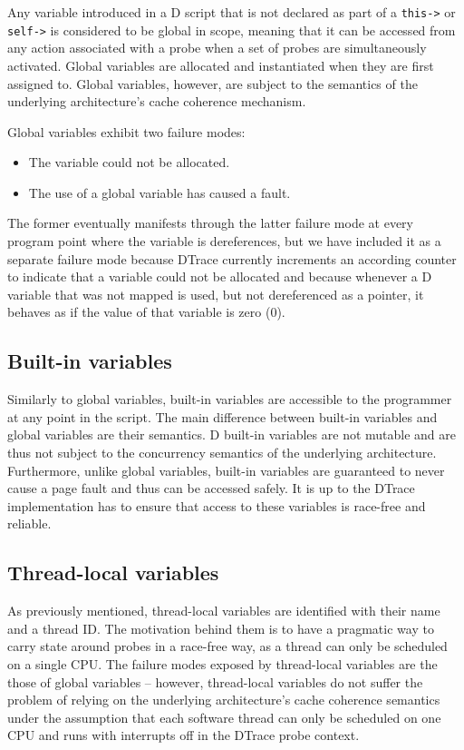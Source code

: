Any variable introduced in a D script that is not declared as part of a
\verb|this->| or \verb|self->| is considered to be global in scope, meaning that
it can be accessed from any action associated with a probe when a set of probes
are simultaneously activated.  Global variables are allocated and instantiated
when they are first assigned to.  Global variables, however, are subject to the
semantics of the underlying architecture's cache coherence mechanism.

Global variables exhibit two failure modes:
\begin{itemize}
\item The variable could not be allocated.
\item The use of a global variable has caused a fault.
\end{itemize}
The former eventually manifests through the latter failure mode at every program
point where the variable is dereferences, but we have included it as a separate failure
mode because DTrace currently increments an according counter to indicate that a
variable could not be allocated and because whenever a D variable that was not mapped
is used, but not dereferenced as a pointer, it behaves as if the value of that variable
is zero (0).

\subsection{Built-in variables}
\label{subsec:builtin-variables}

Similarly to global variables, built-in variables are accessible to the
programmer at any point in the script. The main difference between built-in
variables and global variables are their semantics. D built-in variables are not
mutable and are thus not subject to the concurrency semantics of the underlying
architecture. Furthermore, unlike global variables, built-in variables are
guaranteed to never cause a page fault and thus can be accessed safely. It is up
to the DTrace implementation has to ensure that access to these variables is
race-free and reliable.

\subsection{Thread-local variables}
\label{subsec:thread-local-variables}

As previously mentioned, thread-local variables are identified with their name
and a thread ID. The motivation behind them is to have a pragmatic way to carry
state around probes in a race-free way, as a thread can only be scheduled on a
single CPU. The failure modes exposed by thread-local variables are the those of
global variables -- however, thread-local variables do not suffer the problem of
relying on the underlying architecture's cache coherence semantics under the
assumption that each software thread can only be scheduled on one CPU and runs
with interrupts off in the DTrace probe context.

